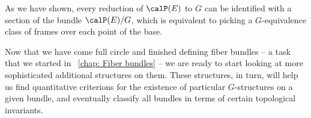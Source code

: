 As we have shown, every reduction of $\calP(E)$ to $G$ can be identified with a section of the bundle $\calP(E)\slash G$, which is equivalent to picking a $G$-equivalence class of frames over each point of the base.


Now that we have come full circle and finished defining fiber bundles -- a task that we started in \Chap~\ref{chap: Fiber bundles} -- we are ready to start looking at more sophisticated additional structures on them. These structures, in turn, will help us find quantitative criterions for the existence of particular $G$-structures on a given bundle, and eventually classify all bundles in terms of certain topological invariants.




